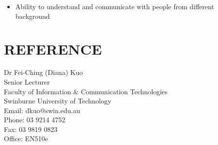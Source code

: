 \documentclass{article}
\begin{document}
	\begin{itemize}
	\item Ability to understand and communicate with people from different background
	\end{itemize}
	
	
\section*{REFERENCE}
	Dr Fei-Ching (Diana) Kuo \\
	Senior Lecturer \\
	Faculty of Information \& Communication Technologies \\
	Swinburne University of Technology \\
	Email: dkuo@swin.edu.au \\
	Phone: 03 9214 4752 \\
	Fax: 03 9819 0823 \\
	Office: EN510e \\
	
\end{document}
